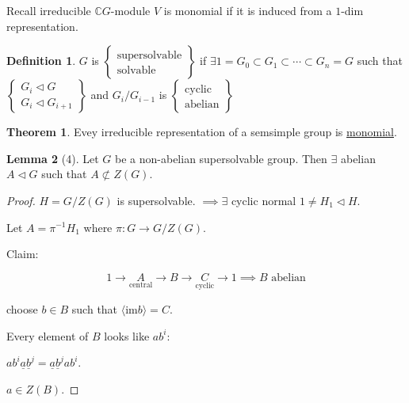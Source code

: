 \documentclass{article}
\theoremstyle{definition}
\newtheorem*{definition}{Definition}
\newtheorem{theorem}{Theorem}
\newtheorem{lemma}[theorem]{Lemma}
\begin{document}
Recall irreducible \(\mathbb{C} G\)-module \(V\) is monomial if it is induced from a \(1\)-dim representation.

\begin{definition}
    \(G\) is \(\begin{Bmatrix}
        \text{supersolvable}  \\
        \text{solvable}
    \end{Bmatrix}\) if \(\exists 1 = G_0 \subset G_1 \subset \cdots \subset G_n = G\) such that \(\begin{Bmatrix}
        G_i \triangleleft G \\
        G_i \triangleleft G_{i+1}
    \end{Bmatrix}\) and \(G_i / G_{i-1} \) is \(\begin{Bmatrix}
         \text{cyclic} \\ \text{abelian} 
    \end{Bmatrix}\) 
\end{definition}

\begin{theorem}
    Evey irreducible representation of a semsimple group is \underline{monomial}.
\end{theorem}

\begin{lemma}
    [4] Let \(G\) be a non-abelian supersolvable group. Then \(\exists\) abelian \(A \triangleleft G\) such that \(A \not\subset Z(G)\).
\end{lemma}

\begin{proof}
    \(H = G / Z(G)\) is supersolvable. \(\implies \exists\) cyclic normal \(1 \neq H_1 \triangleleft H\).

    Let \(A = \pi ^{-1} H_1\) where \(\pi : G \to G / Z(G)\).

    Claim:

    \[
        1 \to \underset{\text{central}}{A} \to B \to \underset{\text{cyclic}}{C} \to 1 \implies B \text{ abelian} 
    \]

    choose \(b\in B\) such that \(\langle \text{im} b \rangle = C\).
    
    Every element of \(B\) looks like \(a b^i\):

    \(a b^i \underline{a} \underline{b}^j = \underline{a}\underline{b}^j a b^i\).

    \(a \in Z(B)\).
\end{proof}
\end{document}

